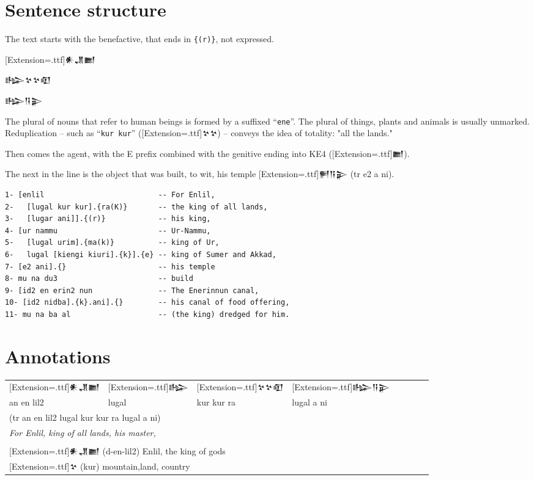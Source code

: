 \documentclass[a4paper,12pt]{book}
\newcommand{\fcn}{\setmainfont{Akkadian}[Extension=.ttf]}
\newcommand{\fcm}{\large\setmainfont{Akkadian}[Extension=.ttf]}
\newcommand{\fsm}{\Large\setmainfont{Akkadian}[Extension=.ttf]}
\begin{document}
\newpage
\section{Sentence structure}
The text starts with the benefactive,
that ends in \verb|{(r)}|, not expressed.

{\fsm 𒀭𒂗𒆤

𒈗𒆳𒆳𒊏

𒈗𒀀𒉌} 

The plural of nouns that refer to human beings
is formed by a suffixed ``\verb|ene|''. The plural of things,
plants and animals is usually unmarked.
Reduplication
-- such as ``\verb|kur kur|'' ({\fcn 𒆳𒆳}) --
conveys the idea of totality: "all the lands."

Then comes the agent, with the E prefix
combined with the genitive ending
into KE4 ({\fcn 𒆤}).

The next in the line is the object that
was built, to wit, his temple {\fcn 𒂍𒀀𒉌}
(tr e2 a ni).
\begin{verbatim}
1- [enlil                          -- For Enlil,
2-   [lugal kur kur].{ra(K)}       -- the king of all lands,
3-   [lugar ani]].{(r)}            -- his king,
4- [ur nammu                       -- Ur-Nammu,
5-   [lugal urim].{ma(k)}          -- king of Ur,
6-   lugal [kiengi kiuri].{k}].{e} -- king of Sumer and Akkad,
7- [e2 ani].{}                     -- his temple
8- mu na du3                       -- build
9- [id2 en erin2 nun               -- The Enerinnun canal,
10- [id2 nidba].{k}.ani].{}        -- his canal of food offering,
11- mu na ba al                    -- (the king) dredged for him.
\end{verbatim}

\section{Annotations}

\begin{tabular}[!h]{l l l l l l l l}
  \fcm 𒀭𒂗𒆤 &\fcm 𒈗 &\fcm 𒆳𒆳𒊏 &\fcm 𒈗𒀀𒉌\\
  an en lil2  & lugal     & kur kur ra & lugal a ni\\
  \multicolumn{4}{l}{(tr an en lil2 lugal kur kur ra lugal a ni) }\\
  \multicolumn{4}{l}{\em For Enlil, king of all lands, his master,}\\
  \hline\\
  \multicolumn{4}{l}{{\fcm 𒀭𒂗𒆤}
     (d-en-lil2) Enlil, the king of gods}\\
  \multicolumn{4}{l}{{\fcm 𒆳}  (kur) mountain,land, country}\\
\end{tabular}
\index{kur {\fcn 𒆳} ! mountain, land, country}
\end{document}

